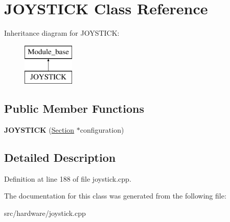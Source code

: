 \hypertarget{classJOYSTICK}{\section{J\-O\-Y\-S\-T\-I\-C\-K Class Reference}
\label{classJOYSTICK}
}
Inheritance diagram for J\-O\-Y\-S\-T\-I\-C\-K\-:\begin{figure}[H]
\begin{center}
\leavevmode
\includegraphics[height=2.000000cm]{classJOYSTICK}
\end{center}
\end{figure}
\subsection*{Public Member Functions}
\begin{DoxyCompactItemize}
\item 
\hypertarget{classJOYSTICK_a0514bda9906877426a42ab28f36154c1}{{\bfseries J\-O\-Y\-S\-T\-I\-C\-K} (\hyperlink{classSection}{Section} $\ast$configuration)}\label{classJOYSTICK_a0514bda9906877426a42ab28f36154c1}

\end{DoxyCompactItemize}


\subsection{Detailed Description}


Definition at line 188 of file joystick.\-cpp.



The documentation for this class was generated from the following file\-:\begin{DoxyCompactItemize}
\item 
src/hardware/joystick.\-cpp\end{DoxyCompactItemize}
